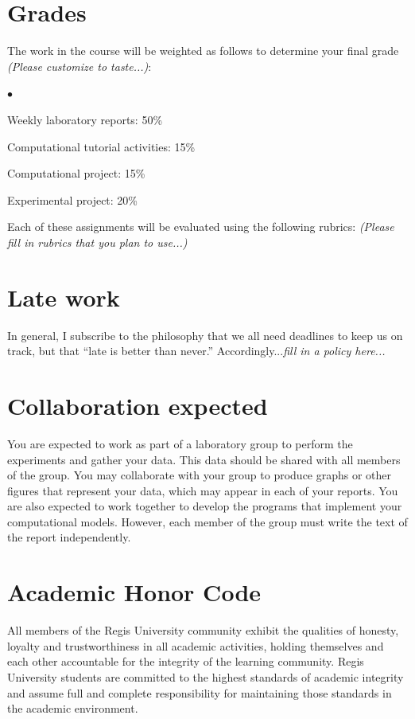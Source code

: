 \documentclass[11pt]{article}
\newcommand{\squishlist}{
   \begin{list}{$\bullet$}
    { \setlength{\itemsep}{0pt}      \setlength{\parsep}{3pt}
      \setlength{\topsep}{3pt}       \setlength{\partopsep}{0pt}
      \setlength{\leftmargin}{1.5em} \setlength{\labelwidth}{1em}
      \setlength{\labelsep}{0.5em} } }
\newcommand{\squishend}{
    \end{list}  }
\begin{document}
\section{Grades}
\noindent The work in the course will be weighted as follows to determine
your final grade {\em (Please customize to taste...)}:
\squishlist
\item Weekly laboratory reports: 50\%
\item Computational tutorial activities: 15\%
\item Computational project: 15\%
\item Experimental project: 20\%
\squishend

Each of these assignments will be evaluated using the following rubrics:
{\em (Please fill in rubrics that you plan to use...)}


\section{Late work}

In general, I subscribe to the philosophy that we all need deadlines to
keep us on track, but that ``late is better than never.''  
Accordingly...{\em fill in a policy here...}

\section{Collaboration expected}
You are expected to work as part of a laboratory group to perform the 
experiments and gather your data.  This data should be shared with all
members of the group.  You may collaborate with your group to produce 
graphs or other figures that represent your data, which may appear in each of 
your reports.  You are also expected to work together to develop the programs
that implement your computational models.
However, each member of the group must write the text of the 
report independently. 

\section{Academic Honor Code}
All members of the Regis University community exhibit the qualities of honesty, loyalty and trustworthiness in all academic activities, holding themselves and each other accountable for the integrity of the learning community. Regis University students are committed to the highest standards of academic integrity and assume full and complete responsibility for maintaining those standards in the academic environment.
\end{document}
